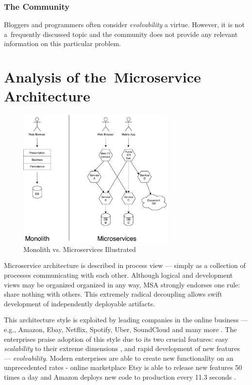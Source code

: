 \documentclass[thesis=M,english,hidelinks]{FITthesis}[2012/10/20]
\begin{document}
\subsection{The Community}
Bloggers and programmers often consider \textit{evolvability} a virtue. However, it is not a~frequently discussed topic and the community does not provide any relevant information on this particular problem.

% 
% 
\chapter{Analysis of the~Microservice Architecture}
\label{sec:msa_analysis}

% 
% 
\begin{figure}[b]
  \centering
    \includegraphics[width=0.7\textwidth]{images/monolith_vs_microservice.pdf}
    \caption{Monolith vs. Microservices Illustrated}
    \label{fig:monolith_vs_microservices}
\end{figure}

Microservice architecture is described in process view --- simply as a collection of processes communicating with each other. Although logical and development views may be organized organized in any way, \acrshort{MSA} strongly endorses one rule: share nothing with others. This extremely radical decoupling allows swift development of independently deployable artifacts.

This architecture style is exploited by leading companies in the online business --- e.g., Amazon, Ebay, Netflix, Spotify, Uber, SoundCloud and many more \cite{ms-who-is-using}. The enterprises praise adoption of this style due to its two crucial features: easy \textit{scalability} to their extreme dimensions \cite{ms-ebay-scalability-best-practices, ms-ebay-ds-scalability, ms-spotify-horizontal-scaling, ms-spotify}, and rapid development of new features --- \textit{evolvability}. Modern enterprises are able to create new functionality on an unprecedented rates - online marketplace Etsy is able to release new features 50 times a day and Amazon deploys new code to production every 11.3 seconds \cite{devops-deploying-hourly}.
\end{document}
